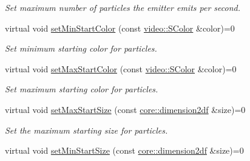\begin{DoxyCompactItemize}
\begin{DoxyCompactList}\small\item\em Set maximum number of particles the emitter emits per second. \end{DoxyCompactList}\item 
\mbox{\label{classirr_1_1scene_1_1IParticleEmitter_a4fcbde10bd7885b5a87f19b0a916b5ca}} 
virtual void \hyperlink{classirr_1_1scene_1_1IParticleEmitter_a4fcbde10bd7885b5a87f19b0a916b5ca}{set\+Min\+Start\+Color} (const \hyperlink{classirr_1_1video_1_1SColor}{video\+::\+S\+Color} \&color)=0
\begin{DoxyCompactList}\small\item\em Set minimum starting color for particles. \end{DoxyCompactList}\item 
\mbox{\label{classirr_1_1scene_1_1IParticleEmitter_a7fe40f02ec88e54ff9d5273495cdf879}} 
virtual void \hyperlink{classirr_1_1scene_1_1IParticleEmitter_a7fe40f02ec88e54ff9d5273495cdf879}{set\+Max\+Start\+Color} (const \hyperlink{classirr_1_1video_1_1SColor}{video\+::\+S\+Color} \&color)=0
\begin{DoxyCompactList}\small\item\em Set maximum starting color for particles. \end{DoxyCompactList}\item 
\mbox{\label{classirr_1_1scene_1_1IParticleEmitter_ab395cff6fc4910e437876aca1edc348c}} 
virtual void \hyperlink{classirr_1_1scene_1_1IParticleEmitter_ab395cff6fc4910e437876aca1edc348c}{set\+Max\+Start\+Size} (const \hyperlink{namespaceirr_1_1core_a54f0e5b7416e6dce5a0f6213f00a580f}{core\+::dimension2df} \&size)=0
\begin{DoxyCompactList}\small\item\em Set the maximum starting size for particles. \end{DoxyCompactList}\item 
\mbox{\label{classirr_1_1scene_1_1IParticleEmitter_a05fdfbf05ef3b86304e55b1712c12725}} 
virtual void \hyperlink{classirr_1_1scene_1_1IParticleEmitter_a05fdfbf05ef3b86304e55b1712c12725}{set\+Min\+Start\+Size} (const \hyperlink{namespaceirr_1_1core_a54f0e5b7416e6dce5a0f6213f00a580f}{core\+::dimension2df} \&size)=0

\end{DoxyCompactItemize}
